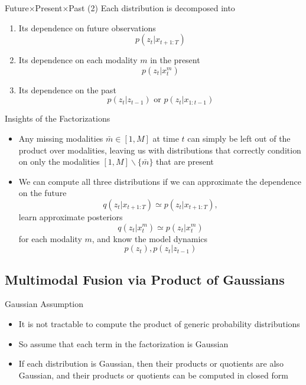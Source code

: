 \documentclass{beamer}
\begin{document}
\begin{frame}{Future$\times$Present$\times$Past (2)}
Each distribution is decomposed into
\begin{enumerate}
\item Its dependence on future observations\[
p(z_t|x_{t+1:T})
\]
\item Its dependence on each modality $m$ in the present\[
p(z_t|x_t^m)
\]
\item Its dependence on the past\[
p(z_t|z_{t-1})\text{ or }p(z_t|x_{1:t-1})
\]
\end{enumerate}
\end{frame}

\begin{frame}{Insights of the Factorizations}
\begin{itemize}
\item Any missing modalities $\bar m\in[1,M]$ at time $t$ can simply be left out of the product over modalities, leaving us with distributions that correctly condition on only the modalities $[1,M]\backslash\{\bar m\}$ that are present
\item We can compute all three distributions if we can approximate the dependence on the future\[
q(z_t|x_{t+1:T})\simeq p(z_t|x_{t+1:T}),
\]learn approximate posteriors\[
q(z_t|x_t^m)\simeq p(z_t|x_t^m)
\]for each modality $m$, and know the model dynamics\[
p(z_t),p(z_t|z_{t-1})
\]
\end{itemize}
\end{frame}

\subsection{Multimodal Fusion via Product of Gaussians}
\begin{frame}{Gaussian Assumption}
\begin{itemize}
\item It is not tractable to compute the product of generic probability distributions
\item So assume that each term in the factorization is Gaussian
\item If each distribution is Gaussian, then their products or quotients are also Gaussian, and their products or quotients can be computed in closed form
\end{itemize}
\end{frame}
\end{document}
